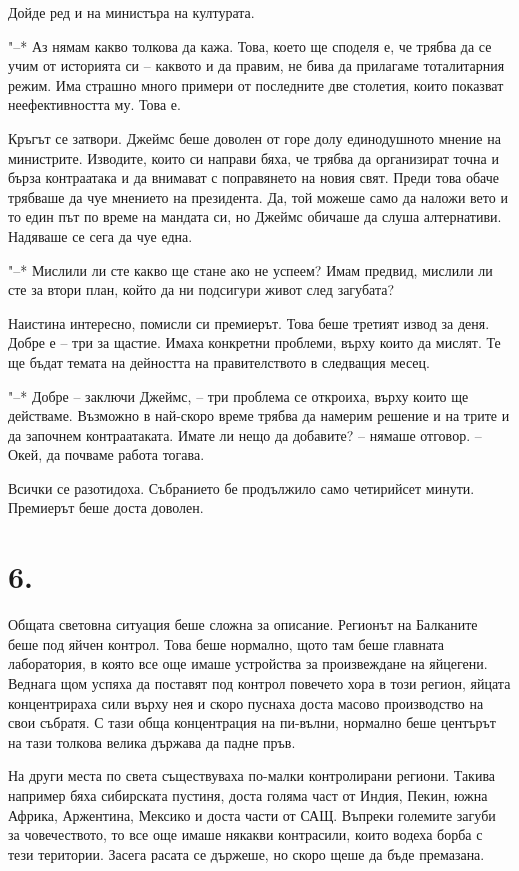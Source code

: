 \documentclass[ebook,openany,12pt]{memoir}
\begin{document}
Дойде ред и на министъра на културата.

"--* Аз нямам какво толкова да кажа. Това, което ще споделя е, че трябва да се учим от историята си – каквото и да правим, не бива да прилагаме тоталитарния режим. Има страшно много примери от последните две столетия, които показват неефективността му. Това е.

Кръгът се затвори. Джеймс беше доволен от горе долу единодушното мнение на министрите. Изводите, които си направи бяха, че трябва да организират точна и бърза контраатака и да внимават с поправянето на новия свят. Преди това обаче трябваше да чуе мнението на президента. Да, той можеше само да наложи вето и то един път по време на мандата си, но Джеймс обичаше да слуша алтернативи. Надяваше се сега да чуе една.

"--* Мислили ли сте какво ще стане ако не успеем? Имам предвид, мислили ли сте за втори план, който да ни подсигури живот след загубата?

Наистина интересно, помисли си премиерът. Това беше третият извод за деня. Добре е – три за щастие. Имаха конкретни проблеми, върху които да мислят. Те ще бъдат темата на дейността на правителството в следващия месец.

"--* Добре -- заключи Джеймс, – три проблема се откроиха, върху които ще действаме. Възможно в най-скоро време трябва да намерим решение и на трите и да започнем контраатаката. Имате ли нещо да добавите? – нямаше отговор. – Окей, да почваме работа тогава.

Всички се разотидоха. Събранието бе продължило само четирийсет минути. Премиерът беше доста доволен.

\section*{6.}

Общата световна ситуация беше сложна за описание. Регионът на Балканите беше под яйчен контрол. Това беше нормално, щото там беше главната лаборатория, в която все още имаше устройства за произвеждане на яйцегени. Веднага щом успяха да поставят под контрол повечето хора в този регион, яйцата концентрираха сили върху нея и скоро пуснаха доста масово производство на свои събратя. С тази обща концентрация на пи-вълни, нормално беше центърът на тази толкова велика държава да падне пръв.

На други места по света съществуваха по-малки контролирани региони. Такива например бяха сибирската пустиня, доста голяма част от Индия, Пекин, южна Африка, Аржентина, Мексико и доста части от САЩ. Въпреки големите загуби за човечеството, то все още имаше някакви контрасили, които водеха борба с тези територии. Засега расата се държеше, но скоро щеше да бъде премазана.
\end{document}
